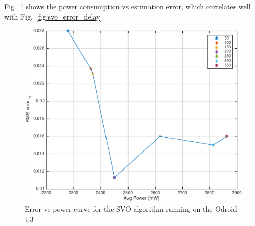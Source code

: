 Fig.~\ref{fig:svoErrVsPower} shows the power consumption vs estimation error, which correlates well with Fig.~\ref{fig:svo_error_delay}.
\begin{figure}[t]
	\centering
	\includegraphics[width=0.9\columnwidth]{figures/errVsPower}
	\caption{Error vs power curve for the SVO algorithm running on the Odroid-U3}
	\label{fig:svoErrVsPower}
\end{figure}
